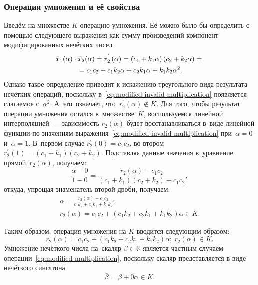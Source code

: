 \subsubsection{Операция умножения и её свойства}
Введём на множестве $K$ операцию умножения. Её можно было бы определить с помощью следующего выражения как сумму произведений компонент модифицированных нечётких чисел
\begin{gather}
  \bar{x}_1(\alpha )\cdot \bar{x}_2(\alpha )=r_{2}^{'}\left( \alpha  \right)=\left( c_1+k_1\alpha  \right)\left( c_2+k_2\alpha \right)={} \notag \\
  \label{eq:modified-invalid-multiplication}
  {}= c_1 c_2+c_1 k_2\alpha+c_2 k_1\alpha+k_1 k_2\alpha^2.
\end{gather}
Однако такое определение приводит к искажению треугольного вида результата нечётких операций, поскольку в~\eqref{eq:modified-invalid-multiplication} появляется слагаемое с~$\alpha^2$. А~это~означает, что~$r_{2}^{'}\left( \alpha  \right)\notin K$. Для того, чтобы результат операции умножения остался в~множестве~$K$, воспользуемся линейной интерполяцией~--- зависимость $r_2\left(\alpha \right)$ будет восстанавливаться в~виде линейной функции по значениям выражения~\eqref{eq:modified-invalid-multiplication} при~$\alpha =0$ и~$\alpha =1$. В~первом случае $r_{2}^{'}\left( 0 \right)=c_1c_2$, во втором $r_{2}^{'}\left( 1 \right)=\left(c_1+k_1 \right)\left( c_2+k_2 \right)$. Подставляя данные значения в~уравнение прямой~$r_2\left( \alpha \right)$, получаем:
\begin{equation*}
  \frac{\alpha-0}{1-0}=\frac{r_2\left( \alpha \right)-c_1 c_2}{\left(c_1+k_1 \right)\left( c_2+k_2 \right)-c_1 c_2},
\end{equation*}
откуда, упрощая знаменатель второй дроби, получаем:
\begin{gather*}
  \alpha =\frac{r_2\left( \alpha \right)-c_1 c_2}{c_1 k_2+c_2 k_1+k_1 k_2}; \\
  r_2\left( \alpha \right)=c_1 c_2+\left(c_1 k_2+ c_2 k_1 +k_1 k_2 \right)\alpha \in K.
\end{gather*}

Таким образом, операция умножения на $K$ вводится следующим образом:
\begin{equation}
\label{eq:modified-multiplication}
  r_2\left( \alpha \right)=c_1 c_2+\left(c_1 k_2+ c_2 k_1 +k_1 k_2 \right)\alpha;\ r_2\left( \alpha  \right)\in K.
\end{equation}
Умножение нечёткого числа на~скаляр $\beta \in \mathbb{R}$ является частным случаем операции~\eqref{eq:modified-multiplication}, поскольку скаляр представляется в виде нечёткого синглтона
\begin{equation*}
  \bar{\beta }=\beta +0\alpha \in K.
\end{equation*}

